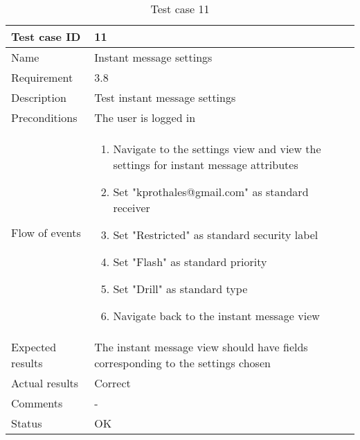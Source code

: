 		\begin{table}
			\begin{tabular}{l|p{10cm}}
				Test case ID & 11 \\ \hline
				Name & Instant message settings\\ \hline
				Requirement & 3.8\\ \hline
				Description & Test instant message settings\\ \hline
				Preconditions & The user is logged in\\ \hline
				Flow of events & 
					\begin{enumerate}
						\item{}Navigate to the settings view and view the settings for instant message attributes
						\item{}Set "kprothales@gmail.com" as standard receiver
						\item{}Set "Restricted" as standard security label
						\item{}Set "Flash" as standard priority
						\item{}Set "Drill" as standard type
						\item{}Navigate back to the instant message view
					\end{enumerate} \\ \hline
				Expected results & The instant message view should have fields corresponding to the settings chosen \\ \hline
				Actual results &Correct\\ \hline
				Comments &-\\ \hline
				Status & OK\\ \hline
			\end{tabular}
			\caption{Test case 11} \label{tab:case11}
		\end{table}

